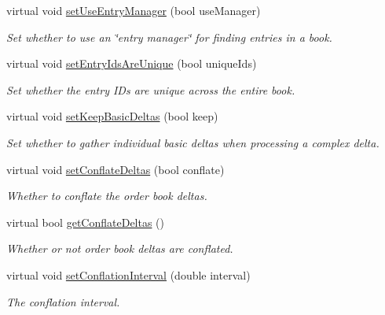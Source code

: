 \begin{CompactItemize}
virtual void \hyperlink{classMamdaQuoteToBookListener_4daf6a6cca90d21bc7902ab6a7ea5008}{set\-Use\-Entry\-Manager} (bool use\-Manager)
\begin{CompactList}\small\item\em Set whether to use an \char`\"{}entry manager\char`\"{} for finding entries in a book. \item\end{CompactList}\item 
virtual void \hyperlink{classMamdaQuoteToBookListener_478d71d5ccdbc4d692d7b69df2ed5c91}{set\-Entry\-Ids\-Are\-Unique} (bool unique\-Ids)
\begin{CompactList}\small\item\em Set whether the entry IDs are unique across the entire book. \item\end{CompactList}\item 
virtual void \hyperlink{classMamdaQuoteToBookListener_23babb647b9432258f2e9b36d1813357}{set\-Keep\-Basic\-Deltas} (bool keep)
\begin{CompactList}\small\item\em Set whether to gather individual basic deltas when processing a complex delta. \item\end{CompactList}\item 
virtual void \hyperlink{classMamdaQuoteToBookListener_fc20509b396b145818c6804ad7a72d63}{set\-Conflate\-Deltas} (bool conflate)
\begin{CompactList}\small\item\em Whether to conflate the order book deltas. \item\end{CompactList}\item 
virtual bool \hyperlink{classMamdaQuoteToBookListener_424049fa1fff7fe0a6e7da84ea9b2da6}{get\-Conflate\-Deltas} ()
\begin{CompactList}\small\item\em Whether or not order book deltas are conflated. \item\end{CompactList}\item 
virtual void \hyperlink{classMamdaQuoteToBookListener_f821050ad069bc72b07f419c441e85cc}{set\-Conflation\-Interval} (double interval)
\begin{CompactList}\small\item\em The conflation interval. \item\end{CompactList}\item 

\end{CompactItemize}
